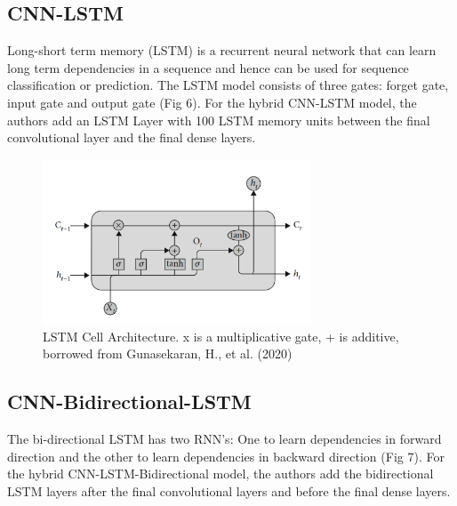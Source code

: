 \documentclass[journal]{IEEEtran}
\begin{document}
  \subsection{CNN-LSTM}
    Long-short term memory (LSTM) is a recurrent neural network that can learn long term dependencies in a sequence and
    hence can be used for sequence classification or prediction. The LSTM model consists of three gates: forget gate, input gate and output gate (Fig 6).
    For the hybrid CNN-LSTM model, the authors add an LSTM Layer with 100 LSTM memory units
    between the final convolutional layer and the final dense layers.

    \begin{figure}
      \centering
      \includegraphics[width=8cm]{figures/lstm_cell.png}
      \caption{LSTM Cell Architecture. x is a multiplicative gate, + is additive, borrowed from Gunasekaran, H., et al. (2020)}
    \end{figure}



  \subsection{CNN-Bidirectional-LSTM}
    The bi-directional LSTM has two RNN’s: One to learn dependencies in forward direction and the other to
    learn dependencies in backward direction (Fig 7). For the hybrid CNN-LSTM-Bidirectional model, the authors add the bidirectional LSTM layers
    after the final convolutional layers and before the final dense layers.
\end{document}
